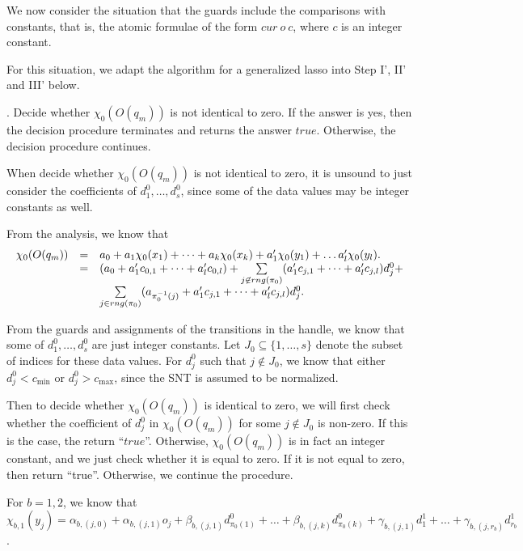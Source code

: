 \documentclass[runningheads,a4paper]{llncs}
\begin{document}
We now consider the situation that the guards include the comparisons with constants, that is, the atomic formulae of the form $cur\ o\ c$, where $c$ is an integer constant. 

For this situation, we adapt the algorithm for a generalized lasso into Step I', II' and III' below.

\smallskip

. Decide whether $\chi_0(O(q_m))$ is not identical to zero. If the answer is yes, then the decision procedure terminates and returns the answer $true$. Otherwise, the decision procedure continues.

When decide whether $\chi_0(O(q_m))$ is not identical to zero, it is unsound to just consider the coefficients of $d^0_1,\dots,d^0_s$, since some of the data values may be integer constants as well. 

From the analysis, we know that 
\[
\begin{array}{l c l }
\chi_0(O(q_m)) & = & a_0 + a_1 \chi_0(x_1) + \dots + a_k \chi_0(x_k) + a'_1 \chi_0(y_1) + \dots a'_l \chi_0(y_l).\\
& = & (a_0+a'_1 c_{0,1} + \dots + a'_l c_{0,l}) + \sum \limits_{j \not \in rng(\pi_0)}  (a'_1 c_{j,1}+\dots + a'_l c_{j,l}) d^0_j+\\
& & \sum \limits_{j \in rng(\pi_0)} (a_{\pi_0^{-1}(j)}+ a'_1 c_{j,1}+\dots + a'_l c_{j,l}) d^0_j.
\end{array}
\]

From the guards and assignments of the transitions in the handle, we know that some of $d^0_1,\dots,d^0_s$ are just integer constants. Let $J_0 \subseteq \{1,\dots,s\}$ denote the subset of indices for these data values. For $d^0_j$ such that $j \not \in J_0$, we know that either $d^0_j < c_{\min}$ or $d^0_j > c_{\max}$, since the SNT is assumed to be normalized.

Then to decide whether $\chi_0(O(q_m))$ is identical to zero, we will first check whether the coefficient of $d^0_j$ in $\chi_0(O(q_m))$ for some $j \not \in J_0$ is non-zero. If this is the case, the return ``$true$''. Otherwise, $\chi_0(O(q_m))$ is in fact an integer constant, and we just check whether it is equal to zero. If it is not equal to zero, then return ``true''. Otherwise, we continue the procedure.

For $b=1,2$, we know that $\chi_{b,1}(y_j) = \alpha_{b,(j,0)} + \alpha_{b,(j,1)} o_j + \beta_{b,(j,1)} d^0_{\pi_0(1)} + \dots + \beta_{b,(j,k)} d^0_{\pi_0(k)} + \gamma_{b,(j,1)} d^1_1 +\dots + \gamma_{b,(j,r_b)} d^1_{r_b}$.
\end{document}
